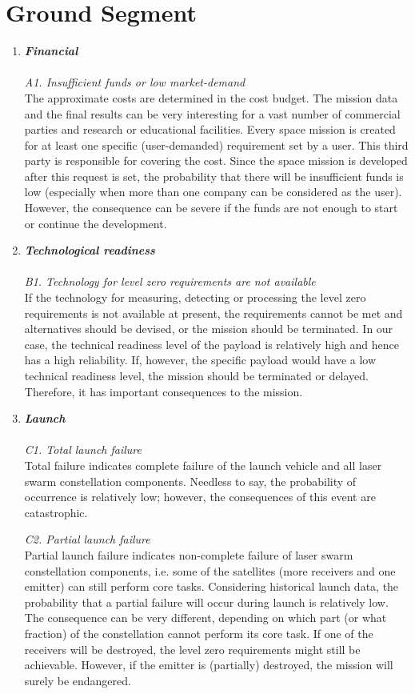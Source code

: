 \documentclass[11pt]{report}
\begin{document}
\section{Ground Segment}
\label{blTRAGs}
\begin{enumerate}[A]
	\item  \textbf{\textit{Financial}} \\\\
\textit{A1. Insufficient funds or low market-demand}\\
The approximate costs are determined in the cost budget. The mission data and the final results can be very interesting for a vast number of commercial parties and research or educational facilities. Every space mission is created for at least one specific (user-demanded) requirement set by a user. This third party is responsible for covering the cost. Since the space mission is developed after this request is set, the probability that there will be insufficient funds is low (especially when more than one company can be considered as the user). However, the consequence can be severe if the funds are not enough to start or continue the development. 

	\item  \textbf{\textit{Technological readiness}} \\\\
\textit{B1. Technology for level zero requirements are not available}\\
If the technology for measuring, detecting or processing the level zero requirements is 	not available at present, the requirements cannot be met and alternatives should be devised, or the mission should be terminated. In our case, the technical readiness level of the 	payload is relatively high and hence has a high reliability. If, however, the specific 	payload would have a low technical readiness level, the mission should be terminated or 	delayed. Therefore, it has important consequences to the mission.

	\item  \textbf{\textit{Launch}} \\\\
\textit{C1. Total launch failure}\\
Total failure indicates complete failure of the launch vehicle and all laser swarm 	constellation components. Needless to say, the probability of occurrence is relatively low; however, the consequences of this event are catastrophic.

\textit{C2. Partial launch failure}\\
Partial launch failure indicates non-complete failure of laser swarm constellation components, i.e. some of the satellites (more receivers and one emitter) can still perform core tasks. Considering historical launch data, the probability that a partial failure will occur during launch is relatively low. The consequence can be very different, depending on which part (or what fraction) of the constellation cannot perform its core task. If one of the receivers will be destroyed, the level zero requirements might still be achievable. However, if the emitter is (partially) destroyed, the mission will surely be endangered. 


\end{enumerate}
\end{document}
